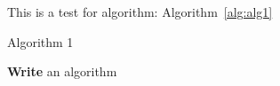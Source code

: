 This is a test for algorithm: Algorithm~\ref{alg:alg1}

\begin{algorithm}[b!]
    \caption{Algorithm 1}\label{alg:alg1}
    \begin{algorithmic}[1]
        \State \textbf{Write} an algorithm 
    \end{algorithmic}
\end{algorithm}


